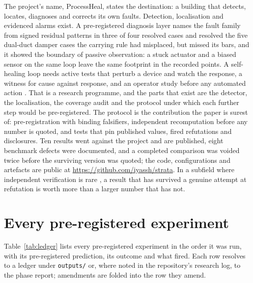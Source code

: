\documentclass[11pt,letterpaper]{article}
\begin{document}
The project's name, ProcessHeal, states the destination: a building that detects, locates, diagnoses and corrects its own faults. Detection, localisation and evidenced alarms exist. A pre-registered diagnosis layer names the fault family from signed residual patterns in three of four resolved cases and resolved the five dual-duct damper cases the carrying rule had misplaced, but missed its bars, and it showed the boundary of passive observation: a stuck actuator and a biased sensor on the same loop leave the same footprint in the recorded points. A self-healing loop needs active tests that perturb a device and watch the response, a witness for cause against response, and an operator study before any automated action \cite{pritoni2022faultcorrection,singh2022pmselfhealing}. That is a research programme, and the parts that exist are the detector, the localisation, the coverage audit and the protocol under which each further step would be pre-registered. The protocol is the contribution the paper is surest of: pre-registration with binding falsifiers, independent recomputation before any number is quoted, and tests that pin published values, fired refutations and disclosures. Ten results went against the project and are published, eight benchmark defects were documented, and a completed comparison was voided twice before the surviving version was quoted; the code, configurations and artefacts are public at \url{https://github.com/iyassh/strata}. In a subfield where independent verification is rare \cite{mukhtar2025reproducibility}, a result that has survived a genuine attempt at refutation is worth more than a larger number that has not.


\appendix
\section{Every pre-registered experiment}
\label{app:ledger}

Table~\ref{tab:ledger} lists every pre-registered experiment in the order it was run, with its pre-registered prediction, its outcome and what fired. Each row resolves to a ledger under \texttt{outputs/} or, where noted in the repository's research log, to the phase report; amendments are folded into the row they amend.
\end{document}
